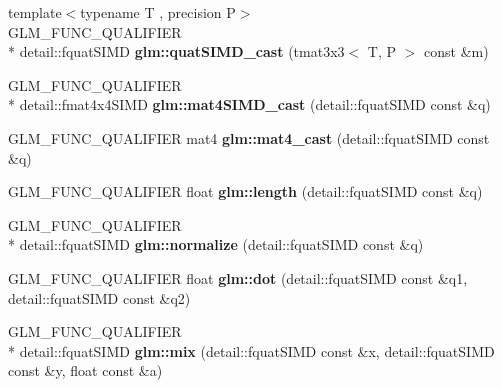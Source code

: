 \begin{DoxyCompactItemize}
\item 
\hypertarget{namespaceglm_a7c78cc8051cf7df0760b2ba061a9f48a}{{\footnotesize template$<$typename T , precision P$>$ }\\G\-L\-M\-\_\-\-F\-U\-N\-C\-\_\-\-Q\-U\-A\-L\-I\-F\-I\-E\-R \\*
detail\-::fquat\-S\-I\-M\-D {\bfseries glm\-::quat\-S\-I\-M\-D\-\_\-cast} (tmat3x3$<$ T, P $>$ const \&m)}\label{namespaceglm_a7c78cc8051cf7df0760b2ba061a9f48a}

\item 
\hypertarget{namespaceglm_a0b2e5499072a338c1256735ecbf363ff}{G\-L\-M\-\_\-\-F\-U\-N\-C\-\_\-\-Q\-U\-A\-L\-I\-F\-I\-E\-R \\*
detail\-::fmat4x4\-S\-I\-M\-D {\bfseries glm\-::mat4\-S\-I\-M\-D\-\_\-cast} (detail\-::fquat\-S\-I\-M\-D const \&q)}\label{namespaceglm_a0b2e5499072a338c1256735ecbf363ff}

\item 
\hypertarget{namespaceglm_a350adcfec63eb015dd2d9ee14a4e8cde}{G\-L\-M\-\_\-\-F\-U\-N\-C\-\_\-\-Q\-U\-A\-L\-I\-F\-I\-E\-R mat4 {\bfseries glm\-::mat4\-\_\-cast} (detail\-::fquat\-S\-I\-M\-D const \&q)}\label{namespaceglm_a350adcfec63eb015dd2d9ee14a4e8cde}

\item 
\hypertarget{namespaceglm_aaa8b73fac4aaa2acdfc98adc48cd15d0}{G\-L\-M\-\_\-\-F\-U\-N\-C\-\_\-\-Q\-U\-A\-L\-I\-F\-I\-E\-R float {\bfseries glm\-::length} (detail\-::fquat\-S\-I\-M\-D const \&q)}\label{namespaceglm_aaa8b73fac4aaa2acdfc98adc48cd15d0}

\item 
\hypertarget{namespaceglm_a31e71acc931a3619a3305958048cfa8d}{G\-L\-M\-\_\-\-F\-U\-N\-C\-\_\-\-Q\-U\-A\-L\-I\-F\-I\-E\-R \\*
detail\-::fquat\-S\-I\-M\-D {\bfseries glm\-::normalize} (detail\-::fquat\-S\-I\-M\-D const \&q)}\label{namespaceglm_a31e71acc931a3619a3305958048cfa8d}

\item 
\hypertarget{namespaceglm_ab68375a7ad5f9dc3db97323af1326bbb}{G\-L\-M\-\_\-\-F\-U\-N\-C\-\_\-\-Q\-U\-A\-L\-I\-F\-I\-E\-R float {\bfseries glm\-::dot} (detail\-::fquat\-S\-I\-M\-D const \&q1, detail\-::fquat\-S\-I\-M\-D const \&q2)}\label{namespaceglm_ab68375a7ad5f9dc3db97323af1326bbb}

\item 
\hypertarget{namespaceglm_a1539ad90a9eb88f535d9dfacba04c1c9}{G\-L\-M\-\_\-\-F\-U\-N\-C\-\_\-\-Q\-U\-A\-L\-I\-F\-I\-E\-R \\*
detail\-::fquat\-S\-I\-M\-D {\bfseries glm\-::mix} (detail\-::fquat\-S\-I\-M\-D const \&x, detail\-::fquat\-S\-I\-M\-D const \&y, float const \&a)}\label{namespaceglm_a1539ad90a9eb88f535d9dfacba04c1c9}


\end{DoxyCompactItemize}
